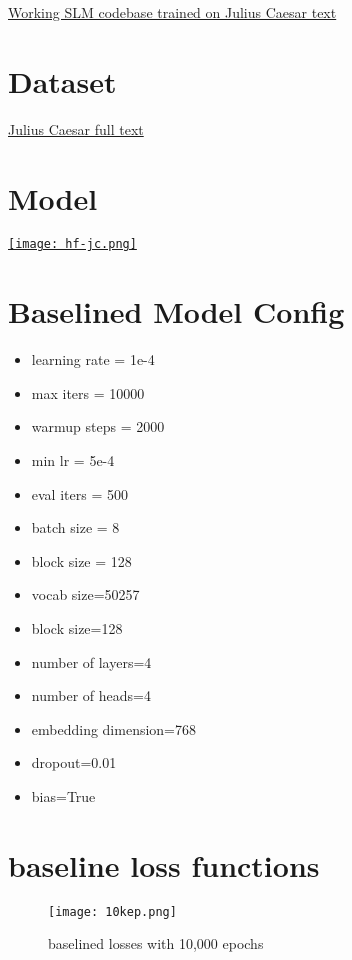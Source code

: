 \documentclass[conference]{IEEEtran}
\begin{document}
\href{https://colab.research.google.com/github/samratkar/samratkar.github.io/blob/main/_posts/concepts/genai/notes-codes/slm-from-scratch/slm-jc.ipynb}{Working SLM codebase trained on Julius Caesar text}

\section{Dataset}

\href{https://www.gutenberg.org/cache/epub/1522/pg1522.txt}{Julius Caesar full text}

\section{Model}

\href{https://huggingface.co/samratkar/slm_julius_caesar}{
  \texttt{[image: hf-jc.png]}
}

\section{Baselined Model Config}
\begin{itemize}
    \item learning rate = 1e-4
    \item max iters = 10000
    \item warmup steps = 2000
    \item min lr = 5e-4
    \item eval iters = 500
    \item batch size = 8
    \item block size = 128
    \item vocab size=50257 
    \item block size=128 
    \item number of layers=4 
    \item number of heads=4 
    \item embedding dimension=768 
    \item dropout=0.01 
    \item bias=True
\end{itemize}

\section{baseline loss functions}
\label{baseline}
\begin{figure}[H]
    \centering
    \texttt{[image: 10kep.png]}
    \caption{baselined losses with 10,000 epochs}
    \label{fig:baselined losses with 10,000 epochs}
\end{figure}
\end{document}
